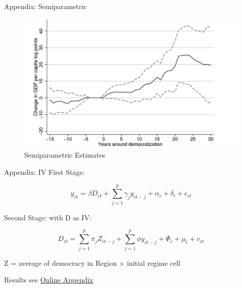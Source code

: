 \documentclass[
  ignorenonframetext,
]{beamer}
\begin{document}
\begin{frame}{Appendix: Semiparametric}
\protect\hypertarget{appendix-semiparametric}{}
\begin{figure}

{\centering \includegraphics{../images/2023-12-05_14-46-53.jpg}

}

\caption{Semiparametric Estimates}

\end{figure}
\end{frame}

\begin{frame}{Appendix: IV}
\protect\hypertarget{appendix-iv}{}
First Stage:

\[
y_{ct} = \beta D_{ct} + \sum_{j=1}^p \gamma_j y_{ct-j} + \alpha_c + \delta_t + \epsilon_{ct}
\]

Second Stage: with D as IV:

\[
D_{ct} = \sum_{j=1}^p \pi_j Z_{ct-j}+ \sum_{j=1}^p \phi y_{ct-j} + \Phi_c+ \mu_t+ v_{ct}
\]

Z = average of democracy in Region \(\times\) initial regime cell

Results see
\href{https://skriptum.github.io/DDCG/vortrag/6-IVReg.html}{Online
Appendix}
\end{frame}
\end{document}
